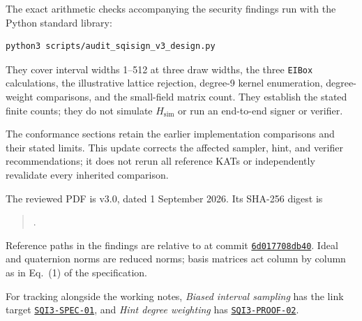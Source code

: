 \documentclass[a4paper,11pt]{article}
\newcommand{\code}[1]{\texttt{#1}}
\newcommand{\Hsim}{H_{\mathrm{sim}}}
\begin{document}
The exact arithmetic checks accompanying the security findings run with
the Python standard library:
\begin{Verbatim}[fontsize=\small,frame=single,framesep=3mm]
python3 scripts/audit_sqisign_v3_design.py
\end{Verbatim}
They cover interval widths 1--512 at three draw widths, the three
\code{EIBox} calculations, the illustrative lattice rejection,
degree-9 kernel enumeration, degree-weight comparisons, and the
small-field matrix count. They establish the stated finite counts;
they do not simulate $\Hsim$ or run an end-to-end signer or verifier.

The conformance sections retain the earlier implementation comparisons
and their stated limits. This update corrects the affected sampler,
hint, and verifier recommendations; it does not rerun all reference
KATs or independently revalidate every inherited comparison.

The reviewed PDF is v3.0, dated 1 September 2026. Its SHA-256 digest is
\begin{quote}\small
{}.
\end{quote}
Reference paths in the findings are relative to  at commit
\href{https://github.com/SQISign/the-sqisign/tree/6d017708db403bf83977fa70770fc4f7f9e9ff21}{\code{6d017708db40}}.
Ideal and quaternion norms are reduced norms; basis matrices act
column by column as in Eq.~(1) of the specification.

For tracking alongside the working notes, \emph{Biased interval sampling}
has the link target \hyperlink{SQI3-SPEC-01}{\code{SQI3-SPEC-01}},
and \emph{Hint degree weighting} has
\hyperlink{SQI3-PROOF-02}{\code{SQI3-PROOF-02}}.
\end{document}
